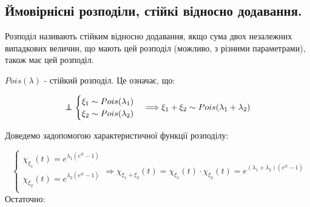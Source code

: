 \subsection{Ймовірнісні розподіли, стійкі відносно додавання.}

\begin{defo}
	Розподіл називають стійким відносно додавання, якщо сума двох незалежних випадкових
	величин, що мають цей розподіл (можливо, з різними параметрами), також має цей розподіл.
\end{defo}
$Pois(\lambda)$ - стійкий розподіл. Це означає, що:


$$
\independent
\begin{cases}
	\xi_1 \sim Pois(\lambda_1)\\
	\xi_2 \sim Pois(\lambda_2)
\end{cases} \Longrightarrow \xi_1 + \xi_2 \sim Pois(\lambda_1 + \lambda_2)
$$


Доведемо задопомогою характеристичної функції розподілу:

$$
\begin{cases}
\chi_{\xi_1} (t) = e^{\lambda_1(e^{it} - 1)} \\
\chi_{\xi_2} (t) = e^{\lambda_2(e^{it} - 1)} \\
\end{cases} \Longrightarrow \chi_{\xi_1 + \xi_2} (t) = \chi_{\xi_1} (t)\cdot \chi_{\xi_2} (t)= e^{(\lambda_1 + \lambda_2)( e^{it} -1 ) }
$$
Остаточно: \\

